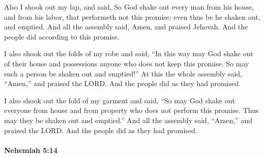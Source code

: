 			\begin{versebox}
					\item[BHS] 
					\item[LXX] 
					\item[ASV] Also I shook out my lap, and said, So God shake out every man from his house, and from his labor, that performeth not this promise; even thus be he shaken out, and emptied. And all the assembly said, Amen, and praised Jehovah. And the people did according to this promise.
					\item[NIV] I also shook out the folds of my robe and said, “In this way may God shake out of their house and possessions anyone who does not keep this promise. So may such a person be shaken out and emptied!” At this the whole assembly said, “Amen,” and praised the LORD. And the people did as they had promised.
					\item[NRSV] I also shook out the fold of my garment and said, “So may God shake out everyone from house and from property who does not perform this promise. Thus may they be shaken out and emptied.” And all the assembly said, “Amen,” and praised the LORD. And the people did as they had promised.
			\end{versebox}

		\paragraph{Nehemiah 5:14} %
			\label{NEHEMIAH-5-14}

